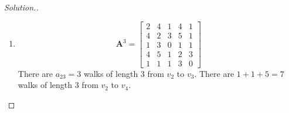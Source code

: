 \begin{enumerate}
\begin{proof}[Solution.]
\begin{enumerate}
\item
\[
\bm A^{3} = \begin{bmatrix}
2&4&1&4&1\\4&2&3&5&1\\1&3&0&1&1\\4&5&1&2&3\\1&1&1&3&0
\end{bmatrix}
\]
There are $a_{23}=3$ walks of length 3 from $v_2$ to $v_3$. There are $1+1+5=7$ walks of length 3 from $v_2$ to $v_4$.
\end{enumerate}
\end{proof}
\end{enumerate}